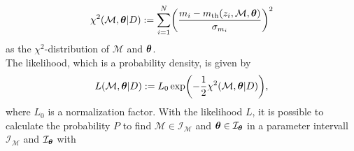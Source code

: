 \begin{align}
    \chi^2(\mathcal{M}, \vb*{\theta} \vert D) := \sum_{i=1}^{N} \biggl(\frac{m_{i} - m_{\text{th}}(z_{i}, \mathcal{M}, \vb*{\theta})}{\sigma_{m_{i}}}\biggr)^2 \label{eq:chi-square} 
\end{align}
as the $\chi^2$-distribution of $\mathcal{M}$ and $\vb*{\theta}$. \\
\noindent The likelihood, which is a probability density, is given by 
\begin{align}
    L(\mathcal{M}, \vb*{\theta} \vert D) := L_{0} \exp \biggl(-\frac{1}{2} \chi^2(\mathcal{M}, \vb*{\theta} \vert D) \biggr),  \label{eq:likelihood}
\end{align}
where $L_{0}$ is a normalization factor.
With the likelihood $L$, it is possible to calculate the probability $P$ to find $\mathcal{M} \in \mathcal{I}_{\mathcal{M}}$ and $\vb*{\theta} \in \mathcal{I}_{\vb*{\theta}}$ in a parameter intervall $\mathcal{I}_{\mathcal{M}}$ and $\mathcal{I}_{\vb*{\theta}}$ with 


